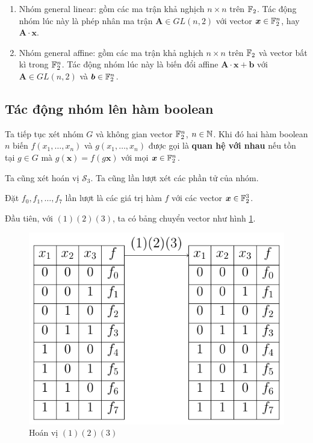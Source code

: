 \begin{enumerate}
    \item Nhóm general linear: gồm các ma trận khả nghịch $n \times n$ trên $\mathbb{F}_2$. Tác động nhóm lúc này là phép nhân ma trận $\bm{A} \in GL(n, 2)$ với vector $\bm{x} \in \mathbb{F}_2^n$, hay $\bm{A} \cdot \bm{x}$.
    \item Nhóm general affine: gồm các ma trận khả nghịch $n \times n$ trên $\mathbb{F}_2$ và vector bất kì trong $\mathbb{F}_2^n$. Tác động nhóm lúc này là biến đổi affine $\bm{A} \cdot \bm{x} + \bm{b}$ với $\bm{A} \in GL(n, 2)$ và $\bm{b} \in \mathbb{F}_2^n$.
\end{enumerate}



\subsection*{Tác động nhóm lên hàm boolean}

Ta tiếp tục xét nhóm $G$ và không gian vector $\mathbb{F}_2^n$, $n \in \mathbb{N}$. Khi đó hai hàm boolean $n$ biến $f(x_1, \ldots, x_n)$ và $g(x_1, \ldots, x_n)$ được gọi là \textbf{quan hệ với nhau} nếu tồn tại $g \in G$ mà $g(\bm{x}) = f(g \bm{x})$ với mọi $\bm{x} \in \mathbb{F}_2^n$.

Ta cũng xét hoán vị $\mathcal{S}_3$. Ta cũng lần lượt xét các phần tử của nhóm.

Đặt $f_0, f_1, \ldots, f_7$ lần lượt là các giá trị hàm $f$ với các vector $\bm{x} \in \mathbb{F}_2^3$.

Đầu tiên, với $(1)(2)(3)$, ta có bảng chuyển vector như hình \ref{burnside:first}.

\begin{figure}[ht]
    \centering
    \includegraphics[page=1]{figures/burnside.pdf}
    \caption{Hoán vị $(1)(2)(3)$}
    \label{burnside:first}
\end{figure}

